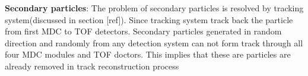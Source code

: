 \textbf{Secondary particles}:
The problem of secondary particles is resolved by tracking system(discussed in section [ref]). Since tracking system track back the particle from first MDC to TOF detectors. Secondary particles generated in random direction and randomly from any detection system can not form track through all four MDC modules and TOF doctors. This implies that these are particles are already removed in track reconstruction process


